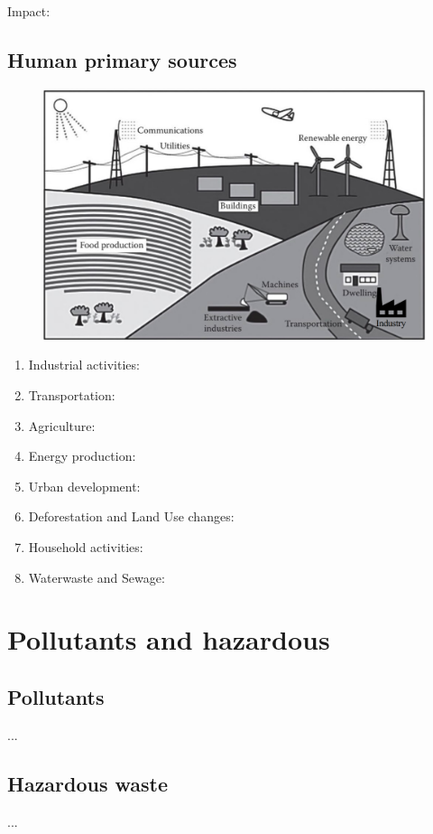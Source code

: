 \documentclass{article}
\newcommand{\cfig}[1]{%
  \begin{figure}[ht!]%
    \centering%
    #1%
  \end{figure}%
}
\begin{document}
Impact:

\subsection{Human primary sources}
\cfig{\includegraphics*[width=.8\textwidth]{media/anthrosphere.png}}
\begin{enumerate}
    \item Industrial activities:
    \item Transportation:
    \item Agriculture:
    \item Energy production:
    \item Urban development:
    \item Deforestation and Land Use changes:
    \item Household activities:
    \item Waterwaste and Sewage:
\end{enumerate}

\section{Pollutants and hazardous}
\subsection{Pollutants}
...

\subsection{Hazardous waste}
...
\end{document}
